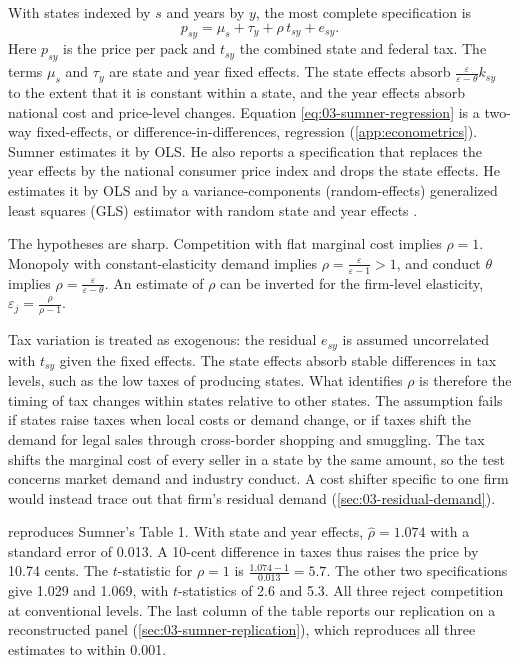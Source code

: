 With states indexed by $s$ and years by $y$, the most complete specification is
\begin{equation}\label{eq:03-sumner-regression}
p_{sy} = \mu_s + \tau_y + \rho\, t_{sy} + e_{sy}.
\end{equation}
Here $p_{sy}$ is the price per pack and $t_{sy}$ the combined state and federal tax. The terms $\mu_s$ and $\tau_y$ are
state and year fixed effects. The state effects absorb $\frac{\varepsilon}{\varepsilon - \theta}k_{sy}$ to the extent that it is
constant within a state, and the year effects absorb national cost and price-level changes. Equation
\eqref{eq:03-sumner-regression} is a two-way fixed-effects, or difference-in-differences, regression
(\cref{app:econometrics}). Sumner estimates it by OLS. He also reports a specification that replaces the year effects
by the national consumer price index and drops the state effects. He estimates it by OLS and by a variance-components
(random-effects) generalized least squares (GLS) estimator with random state and year effects
\citep{FullerBattese1974}.

The hypotheses are sharp. Competition with flat marginal cost implies $\rho = 1$. Monopoly with constant-elasticity
demand implies $\rho = \frac{\varepsilon}{\varepsilon - 1} > 1$, and conduct $\theta$ implies
$\rho = \frac{\varepsilon}{\varepsilon - \theta}$. An estimate of $\rho$ can be inverted for the firm-level elasticity,
$\varepsilon_j = \frac{\rho}{\rho - 1}$.

Tax variation is treated as exogenous: the residual $e_{sy}$ is assumed uncorrelated with $t_{sy}$ given the fixed
effects. The state effects absorb stable differences in tax levels, such as the low taxes of producing states. What
identifies $\rho$ is therefore the timing of tax changes within states relative to other states. The assumption fails
if states raise taxes when local costs or demand change, or if taxes shift the demand for legal sales through
cross-border shopping and smuggling. The tax shifts the marginal cost of every seller in a state by the same amount, so
the test concerns market demand and industry conduct. A cost shifter specific to one firm would instead trace out that
firm's residual demand (\cref{sec:03-residual-demand}).

 reproduces Sumner's Table 1. With state and year effects, $\hat\rho = 1.074$ with a standard
error of 0.013. A 10-cent difference in taxes thus raises the price by 10.74 cents. The $t$-statistic for $\rho = 1$ is
$\frac{1.074 - 1}{0.013} = 5.7$. The other two specifications give 1.029 and 1.069, with $t$-statistics of 2.6 and 5.3.
All three reject competition at conventional levels. The last column of the table reports our replication on a
reconstructed panel (\cref{sec:03-sumner-replication}), which reproduces all three estimates to within 0.001.

